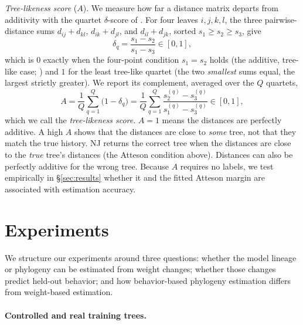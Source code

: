 \documentclass{article}
\theoremstyle{definition}
\theoremstyle{plain}
\begin{document}
\textit{Tree-likeness score} ($A$). We measure how far a distance matrix departs from additivity with the quartet
$\delta$-score of \citet{holland2002delta}. For four leaves $i,j,k,l$, the three pairwise-distance sums $d_{ij}+d_{kl}$, $d_{ik}+d_{jl}$, and $d_{il}+d_{jk}$,
sorted $s_1\ge s_2\ge s_3$, give
\[
  \delta_q=\frac{s_1-s_2}{s_1-s_3}\in[0,1] ,
\]
which is $0$ exactly when the four-point condition $s_1=s_2$ holds
(the additive, tree-like case; \citealp{sempleSteel2003phylogenetics}) and $1$ for the least tree-like quartet (the two \emph{smallest}
sums equal, the largest strictly greater). We report its complement, averaged over the $Q$ quartets,
\[
  A=\frac{1}{Q}\sum_{q=1}^{Q}\bigl(1-\delta_q\bigr)
   =\frac{1}{Q}\sum_{q=1}^{Q}\frac{s_2^{(q)}-s_3^{(q)}}{s_1^{(q)}-s_3^{(q)}}\in[0,1] ,
\]
which we call the \emph{tree-likeness score}. $A=1$ means the distances are perfectly additive. A high $A$ shows that the distances are close to \emph{some} tree, not that they match the true history. NJ returns the correct tree when the distances are close to the \emph{true} tree's distances (the Atteson condition above). Distances can also be perfectly additive for the wrong tree. Because $A$ requires no labels,
we test empirically in \S\ref{sec:results} whether it and the  fitted Atteson margin  are associated with  estimation accuracy.


\section{Experiments}
\label{sec:experiments}
We structure our experiments around three questions: whether the model lineage or phylogeny can be
estimated from weight changes; whether those changes predict held-out behavior; and
how behavior-based phylogeny estimation differs from weight-based estimation.

\paragraph{Controlled and real training trees.}
\label{sec:exp:trees}
\end{document}
